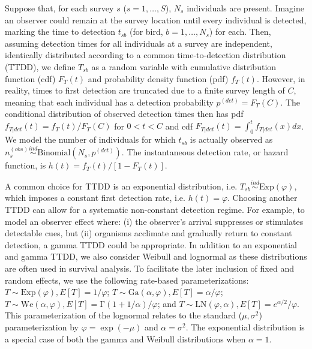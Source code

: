 \documentclass[useAMS,usenatbib,referee,12pt]{article}
\newcommand{\Exp}{\mbox{Exp}}
\newcommand{\Ga}{\mbox{Ga}}
\newcommand{\We}{\mbox{We}}
\newcommand{\LN}{\mbox{LN}}
\newcommand{\pdet}{p^{(det)}}
\newcommand{\ind}{\stackrel{ind}{\sim}}
\begin{document}
Suppose that, for each survey $s$ ($s=1,\dots,S$), $N_s$ individuals are present.  
Imagine an observer could remain at the survey location until every individual is detected, marking the time to detection $t_{sb}$ (for bird, $b=1,\dots,N_s$) for each.
Then, assuming detection times for all individuals at a survey are independent, identically distributed according to a common time-to-detection distribution (TTDD), we define $T_{sb}$ as a random variable with cumulative distribution function (cdf) $F_T(t)$ and probability density function (pdf) $f_T(t)$.
However, in reality, times to first detection are truncated due to a finite survey length of $C$, meaning that each individual has a detection probability $\pdet=F_T(C)$.  
The conditional distribution of observed detection times then has pdf $f_{T|det}(t)= f_T(t)/F_T(C)$ for $0<t<C$ and cdf $F_{T|det}(t) = \int_0^t f_{T|det}(x) dx$. 
We model the number of individuals for which $t_{sb}$ is actually observed as $n_{s}^{(obs)} \ind \mbox{Binomial}\left(N_{s}, \pdet\right)$.
The instantaneous detection rate, or hazard function, is $h(t) = f_T(t) / [1-F_T(t)]$.

A common choice for TTDD is an exponential distribution, i.e. $T_{sb}\ind \mbox{Exp}(\varphi)$, which imposes a constant first detection rate, i.e. $h(t) = \varphi$.
Choosing another TTDD can allow for a systematic non-constant detection regime. 
For example, to model an observer effect where: (i) the observer's arrival suppresses or stimulates detectable cues, but (ii) organisms acclimate and gradually return to constant detection, a gamma TTDD could be appropriate.
In addition to an exponential and gamma TTDD, we also consider Weibull and lognormal as these distributions are often used in survival analysis. 
To facilitate the later inclusion of fixed and random effects, we use the following rate-based parameterizations: $T\sim \Exp(\varphi), E[T]=1/\varphi$; $T\sim \Ga(\alpha,\varphi), E[T] = \alpha/\varphi$; $T\sim \We(\alpha,\varphi), E[T]=\mathrm{\Gamma}(1+1/\alpha)/\varphi$; and $T\sim \LN(\varphi,\alpha), E[T] = e^{\alpha/2}/\varphi$.  
This parameterization of the lognormal relates to the standard ($\mu, \sigma^2$) parameterization by $\varphi = \exp(-\mu)$ and $\alpha = \sigma^2$.  %
The exponential distribution is a special case of both the gamma and Weibull distributions when $\alpha=1$. 
\end{document}
